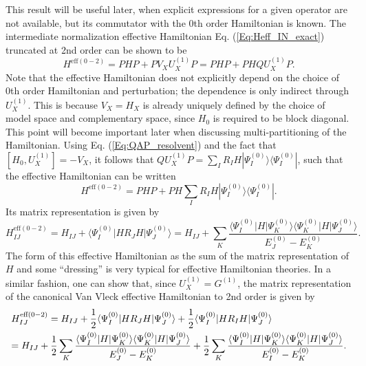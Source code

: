 This result will be useful later, when explicit expressions for a given operator are not available, but its commutator with the 0th order Hamiltonian is known.
The intermediate normalization effective Hamiltonian Eq. (\ref{Eq:Heff_IN_exact}) truncated at 2nd order can be shown to be\cite{ShaviR_1980_5711}
	\begin{equation}
	\label{Eq:Heff_IN}
	{H^{{\text{eff}}(0 - 2)}} = PHP + P{V_X}U_X^{(1)}P = PHP + PHQU_X^{(1)}P.
	\end{equation} 	
Note that the effective Hamiltonian does not explicitly depend on the choice of 0th order Hamiltonian and perturbation; the dependence is only indirect through $U_X^{(1)}$. This is because ${V_X} = {H_X}$ is already uniquely defined by the choice of model space and complementary space, since $H_0$ is required to be block diagonal. This point will become important later when discussing multi-partitioning of the Hamiltonian.
Using Eq. (\ref{Eq:QAP_resolvent}) and the fact that $[{H_0},U_X^{(1)}] =  - {V_X}$,\cite{ShaviR_1980_5711} it follows that $QU_X^{(1)}P = \sum_I {{R_I}} H|\Psi _I^{(0)}\rangle \langle \Psi _I^{(0)}|$, such that the effective Hamiltonian can be written
	\begin{equation}
	{H^{{\text{eff}}(0 - 2)}} = PHP + PH\sum\limits_I {{R_I}} H|\Psi _I^{(0)}\rangle \langle \Psi _I^{(0)}|.
	\end{equation} 	
Its matrix representation is given by
	\begin{equation}
	\label{Eq:Heff0-2IN}
	H_{IJ}^{{\text{eff}}(0 - 2)} = {H_{IJ}} + \langle \Psi _I^{(0)}|H{R_J}H|\Psi _J^{(0)}\rangle  = {H_{IJ}} + \sum\limits_K {\frac{{\langle \Psi _I^{(0)}|H|\Psi _K^{(0)}\rangle \langle \Psi _K^{(0)}|H|\Psi _J^{(0)}\rangle }}{{E_J^{(0)} - E_K^{(0)}}}}. 
	\end{equation}
The form of this effective Hamiltonian as the sum of the matrix representation of $H$ and some ``dressing'' is very typical for effective Hamiltonian theories.
In a similar fashion, one can show that, since $U_X^{(1)} = {G^{(1)}}$, the matrix representation of the canonical Van Vleck effective Hamiltonian to 2nd order is given by\cite{ShaviR_1980_5711}
	\begin{equation}
	\label{Eq:Heff0-2CVV}
	\begin{gathered}
  H_{IJ}^{{\text{eff}}(0 - 2)} = {H_{IJ}} + \frac{1}{2}\langle \Psi _I^{(0)}|H{R_J}H|\Psi _J^{(0)}\rangle  + \frac{1}{2}\langle \Psi _I^{(0)}|H{R_I}H|\Psi _J^{(0)}\rangle  \hfill \\
   = {H_{IJ}} + \frac{1}{2}\sum\limits_K {\frac{{\langle \Psi _I^{(0)}|H|\Psi _K^{(0)}\rangle \langle \Psi _K^{(0)}|H|\Psi _J^{(0)}\rangle }}{{E_J^{(0)} - E_K^{(0)}}}}  + \frac{1}{2}\sum\limits_K {\frac{{\langle \Psi _I^{(0)}|H|\Psi _K^{(0)}\rangle \langle \Psi _K^{(0)}|H|\Psi _J^{(0)}\rangle }}{{E_I^{(0)} - E_K^{(0)}}}} .  
\end{gathered} 
\end{equation} 	
